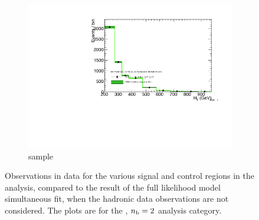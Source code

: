 \begin{figure}[h!]
\begin{subfigure}[b]{0.48\textwidth}
    \includegraphics[width=\textwidth,page=4]
    {Figs/results/v0/greenBand/bestFit_2012dev_RQcdZero_fZinvAll_2b_le3j-1_smOnly}
    \caption{\mj sample}
  \end{subfigure}
  \caption{Observations in data for the various signal and control
  regions in the analysis, compared to the result of the full likelihood model
  simultaneous fit, when the hadronic data observations are not considered. The
  plots are for the \njlow, $n_{\text{b}} = 2$ analysis category.}
  \label{fig:green_fits_2b_le3j}
\end{figure}

